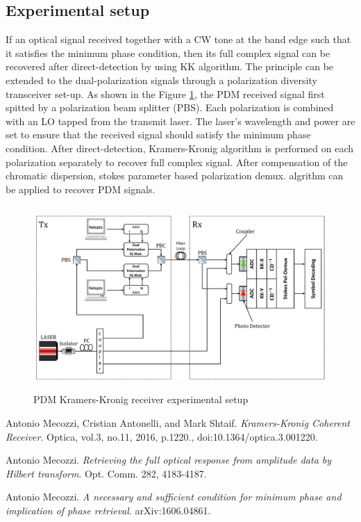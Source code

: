 \subsection{Experimental setup}
If an optical signal received together with a CW tone at the band edge such that it satisfies the minimum phase condition, then its full complex signal can be recovered after direct-detection by using KK algorithm. The principle can be extended to the dual-polarization signals through a polarization diversity transceiver set-up. As shown in the Figure \ref{Practical_setup_TxRx}, the PDM received signal first spitted by a polarization beam splitter (PBS). Each polarization is combined with an LO tapped from the transmit laser. The laser's wavelength and power are set to ensure that the received signal should satisfy the minimum phase condition. After direct-detection, Kramers-Kronig algorithm is performed on each polarization separately to recover full complex signal. After compensation of the chromatic dispersion, stokes parameter based polarization demux. algrithm can be applied to recover PDM signals.     
\begin{figure}[h]
	\centering
	\includegraphics[width=1.0\textwidth, height=7cm]{./sdf/simplified_coherent_receiver/figures/Practical_setup_TxRx.pdf}
	\caption{PDM Kramers-Kronig receiver experimental setup}\label{Practical_setup_TxRx}
\end{figure}



\begin{thebibliography}{9}
	Antonio Mecozzi, Cristian Antonelli, and Mark Shtaif.
	\textit{Kramers-Kronig Coherent Receiver}.
	Optica, vol.3, no.11, 2016, p.1220., doi:10.1364/optica.3.001220.
	
	Antonio Mecozzi.
	\textit{Retrieving the full optical response from amplitude data by Hilbert transform}. Opt. Comm. 282, 4183-4187.
	
	Antonio Mecozzi.
	\textit{A necessary and sufficient condition for minimum phase and implication of phase retrieval}. arXiv:1606.04861.
\end{thebibliography}

